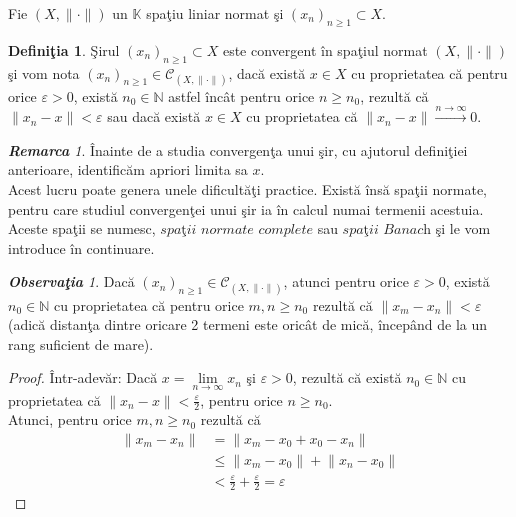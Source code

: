 \documentclass[ a4paper, 12pt]{report}
\theoremstyle{definition}
\newtheorem{definition}{\bf Defini\c tia}[section]
\theoremstyle{remark}
\newtheorem{remarc}{\bf Remarca}[section]
\newtheorem{obs}{\bf Observa\c tia }[section]
\numberwithin{equation}{section}
\begin{document}
Fie $(X, \lVert \cdot \rVert)$ un $\mathbb{K}$ spa\c tiu  liniar normat \c si $(x_n)_{n \geq 1} \subset X.$\\
\begin{definition}
\c Sirul $(x_n)_{n \geq 1} \subset X$ este convergent \^in spa\c tiul normat $(X, \lVert \cdot \rVert)$ \c si vom nota $(x_n)_{n \geq 1} \in \mathcal{C}_{(X, \lVert \cdot \rVert)}$,  dac\u a exist\u a $x \in X$  cu proprietatea c\u a pentru orice $\varepsilon>0$, exist\u a $ n_0 \in \mathbb{N}$ astfel \^inc\^at pentru orice $n \geq n_0$, rezult\u a c\u a $\lVert x_n - x \rVert < \varepsilon$ sau dac\u a exist\u a $x \in X$ cu proprietatea c\u a $\lVert x_n - x \rVert \stackrel{n \rightarrow \infty}{\longrightarrow } 0$.
\end{definition}
\begin{remarc}
\^Inainte de a studia convergen\c ta unui \c sir, cu ajutorul defini\c tiei anterioare, identific\u am  apriori limita sa $x$.\\
Acest lucru poate genera unele dificult\u a\c ti practice. Exist\u a \^ins\u a spa\c tii normate, pentru care studiul convergen\c tei unui \c sir ia \^in calcul numai termenii acestuia. Aceste spa\c tii se numesc,$\textit{ spa\c tii normate complete}$ sau $\textit{spa\c tii Banach}$ \c si le vom introduce \^in continuare.
\end{remarc}
\begin{obs}
Dac\u a $(x_n)_{n \geq 1} \in \mathcal{C}_{(X, \lVert \cdot \rVert)}$, atunci pentru orice $\varepsilon >0$, exist\u a $n_0 \in \mathbb{N}$ cu proprietatea c\u a pentru orice $m,n \geq n_0$ rezult\u a  c\u a $\lVert x_m - x_n \rVert < \varepsilon $ (adic\u a distan\c ta dintre oricare 2 termeni este oric\^at de mic\u a, \^incep\^and de la un rang suficient de mare).
\end{obs}
\begin{proof}
\^Intr-adev\u ar: Dac\u a  $x = \lim\limits_{n \rightarrow \infty} x_n$ \c si $\varepsilon>0$, rezult\u a c\u a exist\u a $n_0 \in \mathbb{N}$ cu proprietatea c\u a $\lVert x_n - x \rVert < \frac{\varepsilon}{2}$, pentru orice $n \geq n_0.$\\
Atunci, pentru orice $m,n \geq n_0$ rezult\u a c\u a
\begin{align*}
\lVert x_m - x_n \rVert
&=\lVert x_m - x_0+x_0-x_n \rVert\\ & \leq \lVert x_m - x_0 \rVert +  \lVert x_n - x_0 \rVert \\
&<\frac{\varepsilon}{2}+\frac{\varepsilon}{2} = \varepsilon
\end{align*}
\end{proof}
\end{document}
